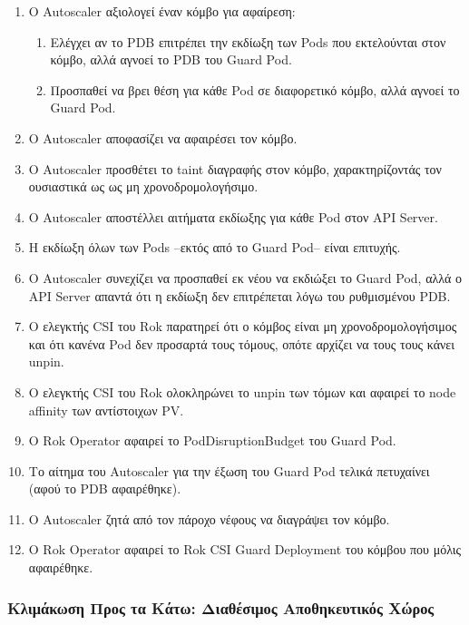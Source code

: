\begin{enumerate}
      \tightlist
      \item Ο Autoscaler αξιολογεί έναν κόμβο για αφαίρεση:
            \begin{enumerate}
                  \item Ελέγχει αν το PDB επιτρέπει την εκδίωξη των Pods που
                        εκτελούνται στον κόμβο, αλλά αγνοεί το PDB του Guard
                        Pod.
                  \item Προσπαθεί να βρει θέση για κάθε Pod σε διαφορετικό
                        κόμβο, αλλά αγνοεί το Guard Pod.
            \end{enumerate}
      \item Ο Autoscaler αποφασίζει να αφαιρέσει τον κόμβο.
      \item Ο Autoscaler προσθέτει το taint διαγραφής στον κόμβο, χαρακτηρίζοντάς τον
            ουσιαστικά ως ως μη χρονοδρομολογήσιμο.
      \item Ο Autoscaler αποστέλλει αιτήματα εκδίωξης για κάθε Pod στον API Server.
      \item Η εκδίωξη όλων των Pods --εκτός από το Guard Pod-- είναι επιτυχής.
      \item Ο Autoscaler συνεχίζει να προσπαθεί εκ νέου να εκδιώξει το Guard Pod, αλλά ο
            API Server απαντά ότι η εκδίωξη δεν επιτρέπεται λόγω του ρυθμισμένου
            PDB.
      \item Ο ελεγκτής CSI του Rok παρατηρεί ότι ο κόμβος είναι μη
            χρονοδρομολογήσιμος και ότι κανένα Pod δεν προσαρτά
            τους τόμους, οπότε αρχίζει να τους τους κάνει unpin.
      \item Ο ελεγκτής CSI του Rok ολοκληρώνει το unpin των τόμων και αφαιρεί το
            node affinity των αντίστοιχων PV.
      \item Ο Rok Operator αφαιρεί το PodDisruptionBudget του Guard Pod.
      \item Το αίτημα του Autoscaler για την έξωση του Guard Pod τελικά πετυχαίνει (αφού
            το PDB αφαιρέθηκε).
      \item Ο Autoscaler ζητά από τον πάροχο νέφους να διαγράψει τον κόμβο.
      \item Ο Rok Operator αφαιρεί το Rok CSI Guard Deployment του κόμβου που
            μόλις αφαιρέθηκε.
\end{enumerate}

\subsubsection{Κλιμάκωση Προς τα Κάτω: Διαθέσιμος Αποθηκευτικός Χώρος}

